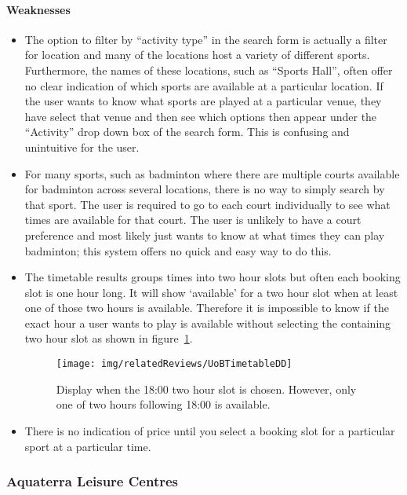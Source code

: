 \paragraph{Weaknesses}
\begin{itemize}
	\item The option to filter by ``activity type'' in the search form is
		actually a filter for location and many of the locations host a variety
		of different sports. Furthermore, the names of these locations, such as
		``Sports Hall'', often offer no clear indication of which sports are
		available at a particular location. If the user wants to know what
		sports are played at a particular venue, they have select that venue
		and then see which options then appear under the ``Activity'' drop down
		box of the search form. This is confusing and unintuitive for the user.
	\item For many sports, such as badminton where there are multiple courts
		available for badminton across several locations, there is no way to
		simply search by that sport. The user is required to go to each court
		individually to see what times are available for that court. The user
		is unlikely to have a court preference and most likely just wants to
		know at what times they can play badminton; this system offers no quick
		and easy way to do this.
	\item The timetable results groups times into two hour slots but often each
		booking slot is one hour long. It will show `available' for a two hour
		slot when at least one of those two hours is available. Therefore it is
		impossible to know if the exact hour a user wants to play is available
		without selecting the containing two hour slot as shown in
		figure~\ref{fig:UoBTimetableDD}.
		\begin{figure}
			\begin{center}
				\texttt{[image: img/relatedReviews/UoBTimetableDD]}
			\end{center}
			\caption{Display when the 18:00 two hour slot is chosen. However,
				only one of two hours following 18:00 is available.
			}\label{fig:UoBTimetableDD}
		\end{figure}

	\item There is no indication of price until you select a booking slot for a
		particular sport at a particular time.
\end{itemize}

\subsubsection{Aquaterra Leisure Centres}
\label{ssub:aquaterra_leisure_centres}

